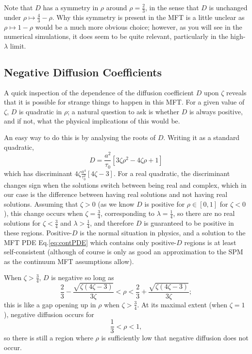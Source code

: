 Note that $D$ has a symmetry in $\rho$ around $\rho = \frac{2}{3}$, in the sense that $D$ is unchanged under $\rho \mapsto \frac{4}{3} - \rho$. Why this symmetry is present in the MFT is a little unclear as $\rho \mapsto 1 - \rho$
would be a much more obvious choice; however, as you will see in the numerical simulations, it does seem to be quite relevant, particularly in the high-$\lambda$ limit.

\subsection{Negative Diffusion Coefficients}
\label{sec:negDiffCoeff}
A quick inspection of the dependence of the diffusion coefficient $D$ upon $\zeta$ reveals that it is possible for strange things to happen in this MFT. For a given value of $\zeta$, $D$ is quadratic in $\rho$; a natural question
to ask is whether $D$ is always positive, and if not, what the physical implications of this would be. 

An easy way to do this is by analysing the roots of $D$. Writing it as a standard quadratic,
\begin{equation}
 D = \frac{a^2}{\tau_0} \left[  3 \zeta \rho^2 - 4 \zeta \rho + 1  \right]
\end{equation}
which has discriminant $4 \zeta \frac{a^4}{\tau_0^2}\left[4 \zeta - 3\right]$. For a real quadratic, the discriminant changes sign when the solutions switch between being real and complex, which in our case is the difference
between having real solutions and not having real solutions. Assuming that $\zeta > 0$ (as we know $D$ is positive for $\rho \in [0, 1]$ for $\zeta<0$),  this change occurs when $\zeta = \frac{3}{4}$, corresponding to $\lambda=\frac{1}{4}$, so there are no real solutions for $\zeta<\frac{3}{4}$ and $\lambda>\frac{1}{4}$,
and therefore $D$ is guaranteed to be positive in these regions. Positive-$D$ is the normal situation in physics, and a solution to the MFT PDE Eq.\eqref{eq:contPDE} which contains only positive-$D$ regions is at  least
self-consistent (although of course is only as good an approximation to the SPM as the continuum MFT assumptions allow).

When $\zeta > \frac{3}{4}$, $D$ is negative so long as
\begin{equation}
 \frac{2}{3} - \frac{\sqrt{\zeta(4\zeta-3)}}{3\zeta} < \rho < \frac{2}{3} + \frac{\sqrt{\zeta(4\zeta-3)}}{3\zeta};
\end{equation}
this is like a gap opening up in $\rho$ when $\zeta > \frac{3}{4}$. At its maximal extent (when $\zeta=1$), negative diffusion occurs for
\begin{equation}
 \frac{1}{3} < \rho < 1,
\end{equation}
so there is still a region where $\rho$ is sufficiently low that negative diffusion does not occur.

